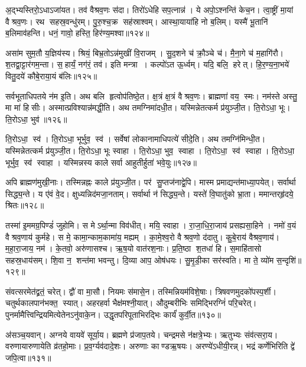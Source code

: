 अ॒द्भ्यस्तिरो॒ऽधाऽजा॑यत। तव॑ वैश्रव॒णः स॑दा। 
तिरो॑ऽधेहि सप॒त्नान्न॑। ये अपो॒ऽश्नन्ति॑ केच॒न। 
त्वा॒ष्ट्रीं मा॒यां वैश्रव॒णः। रथ सहस्र॒वन्धु॑रम्‌। 
पु॒रु॒श्च॒क्र सह॑स्राश्वम्‌। आस्था॒याया॑हि नो ब॒लिम्‌। 
यस्मै॑ भू॒तानि॑ ब॒लिमाव॑हन्ति। धनं॒ गावो॒ हस्ति॒ हिर॑ण्य॒मश्वा\sn{}॥१२४॥


असा॑म सुम॒तौ य॒ज्ञिय॑स्य। श्रियं॒ बिभ्र॒तोऽन्न॑मुखीं वि॒राजम्‌। 
सु॒द॒\ar{}शने च॑ क्रौ॒ञ्चे च॑। मै॒ना॒गे च॑ म॒हागि॑रौ। 
श॒तद्वा॒ट्टार॑गम॒न्ता। स॒हार्यं॒ नग॑रं॒ तव॑। 
इति मन्त्रा। कल्पो॑ऽत ऊ॒र्ध्वम्‌। यदि॒ बलि॒ हरेत्‌। 
हि॒र॒ण्य॒ना॒भये॑ वितु॒दये॑ कौबे॒राया॒यं ब॑लिः॥१२५॥


सर्वभूताधिपतये न॑म इ॒ति। अथ बलि हृत्वोप॑तिष्ठे॒त। 
क्ष॒त्रं क्ष॒त्रं वैश्रव॒णः। ब्राह्मणा॑ वय॒ स्मः। 
नम॑स्ते अस्तु॒ मा मा॑ हिसीः। अस्मात्प्रविश्यान्न॑मद्धी॒ति। 
अथ तमग्निमा॑दधी॒त। यस्मिन्नेतत्कर्म प्र॑युञ्जी॒त। 
ति॒रोऽधा॒ भूः। ति॒रोऽधा॒ भुव॑॥१२६॥


ति॒रोऽधा॒ स्व॑। ति॒रोऽधा॒ भूर्भुव॒ स्व॑। 
सर्वेषां लोकानामाधिपत्ये॑ सीदे॒ति। अथ तमग्नि॑मिन्धी॒त। 
यस्मिन्नेतत्कर्म प्र॑युञ्जी॒त। ति॒रोऽधा॒ भूः स्वाहा। 
ति॒रोऽधा॒ भुव॒ स्वाहा। ति॒रोऽधा॒ स्व॑ स्वाहा। 
ति॒रोऽधा॒ भूर्भुव॒ स्व॑ स्वाहा। 
यस्मिन्नस्य काले सर्वा आहुतीर्\mbox{}हुता॑ भवे॒युः॥१२७॥


अपि ब्राह्मण॑मुखी॒नाः। तस्मिन्नह्नः काले प्र॑युञ्जी॒त। 
पर॑ सु॒प्तज॑नाद्वे॒पि। मास्म प्रमाद्यन्त॑माध्या॒पयेत्‌। 
सर्वार्था सिद्ध्य॒न्ते। य ए॑वं वे॒द। 
क्षुध्यन्निद॑मजा॒नताम्‌। सर्वार्था न॑ सिद्ध्य॒न्ते। 
यस्ते॑ वि॒घातु॑को भ्रा॒ता। ममान्तर्‌हृ॑दये॒ श्रितः॥१२८॥


तस्मा॑ इ॒ममग्र॒पिण्डं॑ जुहोमि। स मेऽर्था॒न्मा विव॑धीत्‌। 
मयि॒ स्वाहा। रा॒जा॒धि॒रा॒जाय॑ प्रसह्यसा॒हिने। 
नमो॑ व॒यं वैश्रव॒णाय॑ कुर्महे। स मे॒ कामा॒न्काम॒कामा॑य॒ मह्यम्‌। 
का॒मे॒श्व॒रो वैश्रव॒णो द॑दातु। कु॒बे॒राय॑ वैश्रव॒णाय॑। 
म॒हा॒रा॒जाय॒ नम॑। के॒तवो॒ अरु॑णासश्च। 
ऋ॒ष॒यो वात॑रश॒नाः। प्र॒ति॒ष्ठा श॒तधा॑ हि। 
स॒माहि॑तासो सहस्र॒धाय॑सम्‌। शि॒वा न॒ शन्त॑मा भवन्तु। 
दि॒व्या आप॒ ओष॑धयः। सु॒मृ॒डी॒का सर॑स्वति। 
मा ते॒ व्यो॑म स॒न्दृशि॑॥१२९॥\anuvakamend


संवत्सरमेत॑द्व्रतं॒ चरेत्‌। द्वौ॑ वा मा॒सौ। 
नियमः स॑मासे॒न। तस्मिन्नियम॑विशे॒षाः। 
त्रिषवणमुदको॑पस्प॒र्शी। चतुर्थकालपान॑भक्त॒ स्यात्‌। 
अहरहर्वा भैक्ष॑मश्नी॒यात्‌। औदुम्बरीभिः समिद्भिरग्निं॑ परि॒चरेत्‌। 
पुनर्मामैत्त्विन्द्रियमि\-त्येतेनऽनु॑वाके॒न। उद्धृतपरिपूताभि\-रद्भिः कार्यं॑ कुर्वी॒त॥१३०॥


अ॑सञ्च॒यवान्‌। अग्नये वायवे॑ सूर्या॒य। 
ब्रह्मणे प्र॑जाप॒तये। चन्द्रमसे न॑क्षत्रे॒भ्यः। 
ऋतुभ्यः संव॑त्सरा॒य। वरुणायारुणायेति व्र॑तहो॒माः। 
प्र॒व॒र्ग्यव॑दादे॒शः। अरुणाः काण्डऋ॒षयः। 
अरण्ये॑ऽधीयी॒रन्न्‌। भद्रं कर्णेभिरिति द्वे॑ जपि॒त्वा॥१३१॥


